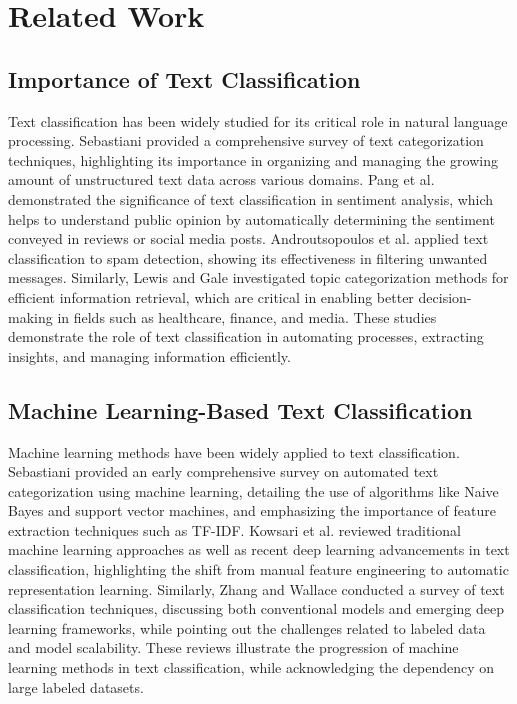 \section{Related Work}
\subsection{Importance of Text Classification}

Text classification has been widely studied for its critical role in natural language processing. Sebastiani \cite{sebastiani2002machine} provided a comprehensive survey of text categorization techniques, highlighting its importance in organizing and managing the growing amount of unstructured text data across various domains. Pang et al.  \cite{pang2002thumbs} demonstrated the significance of text classification in sentiment analysis, which helps to understand public opinion by automatically determining the sentiment conveyed in reviews or social media posts. Androutsopoulos et al. \cite{androutsopoulos2000an} applied text classification to spam detection, showing its effectiveness in filtering unwanted messages. Similarly, Lewis and Gale \cite{lewis1994sequential} investigated topic categorization methods for efficient information retrieval, which are critical in enabling better decision-making in fields such as healthcare, finance, and media. These studies demonstrate the role of text classification in automating processes, extracting insights, and managing information efficiently.

\subsection{Machine Learning-Based Text Classification}

Machine learning methods have been widely applied to text classification. Sebastiani \cite{sebastiani2002machine} provided an early comprehensive survey on automated text categorization using machine learning, detailing the use of algorithms like Naive Bayes and support vector machines, and emphasizing the importance of feature extraction techniques such as TF-IDF. Kowsari et al. \cite{kowsari2019text} reviewed traditional machine learning approaches as well as recent deep learning advancements in text classification, highlighting the shift from manual feature engineering to automatic representation learning. Similarly, Zhang and Wallace \cite{zhang2015text} conducted a survey of text classification techniques, discussing both conventional models and emerging deep learning frameworks, while pointing out the challenges related to labeled data and model scalability. These reviews illustrate the progression of machine learning methods in text classification, while acknowledging the dependency on large labeled datasets.

